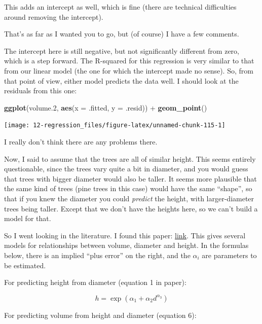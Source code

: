 \documentclass[]{tufte-book}
\newenvironment{Shaded}{}{}
\newcommand{\DataTypeTok}[1]{\textcolor[rgb]{0.56,0.13,0.00}{#1}}
\newcommand{\FloatTok}[1]{\textcolor[rgb]{0.25,0.63,0.44}{#1}}
\newcommand{\KeywordTok}[1]{\textcolor[rgb]{0.00,0.44,0.13}{\textbf{#1}}}
\newcommand{\NormalTok}[1]{#1}
\newcommand{\OperatorTok}[1]{\textcolor[rgb]{0.40,0.40,0.40}{#1}}
\newcommand{\StringTok}[1]{\textcolor[rgb]{0.25,0.44,0.63}{#1}}
\theoremstyle{definition}
\theoremstyle{definition}
\theoremstyle{definition}
\theoremstyle{remark}
\begin{document}
This adds an intercept as well, which is fine (there are technical
difficulties around removing the intercept).

That's as far as I wanted you to go, but (of course) I have a few
comments.

The intercept here is still negative, but not significantly different
from zero, which is a step forward. The R-squared for this regression is
very similar to that from our linear model (the one for which the
intercept made no sense). So, from that point of view, either model
predicts the data well. I should look at the residuals from this one:

\begin{Shaded}
\begin{Highlighting}[]
\KeywordTok{ggplot}\NormalTok{(volume}\FloatTok{.2}\NormalTok{, }\KeywordTok{aes}\NormalTok{(}\DataTypeTok{x =}\NormalTok{ .fitted, }\DataTypeTok{y =}\NormalTok{ .resid)) }\OperatorTok{+}\StringTok{ }
\StringTok{    }\KeywordTok{geom_point}\NormalTok{()}
\end{Highlighting}
\end{Shaded}

\texttt{[image: 12-regression\_files/figure-latex/unnamed-chunk-115-1]}

I really don't think there are any problems there.

Now, I said to assume that the trees are all of similar height. This
seems entirely questionable, since the trees vary quite a bit in
diameter, and you would guess that trees with bigger diameter would also
be taller. It seems more plausible that the same kind of trees (pine
trees in this case) would have the same ``shape'', so that if you knew
the diameter you could \emph{predict} the height, with larger-diameter
trees being taller. Except that we don't have the heights here, so we
can't build a model for that.

So I went looking in the literature. I found this paper:
\href{https://pdfs.semanticscholar.org/5497/3d02d63428e3dfed6645acfdba874ad80822.pdf}{link}.
This gives several models for relationships between volume, diameter and
height. In the formulas below, there is an implied ``plus error'' on the
right, and the \(\alpha_i\) are parameters to be estimated.

For predicting height from diameter (equation 1 in paper):

\[  h = \exp(\alpha_1+\alpha_2 d^{\alpha_3}) \]

For predicting volume from height and diameter (equation 6):
\end{document}
